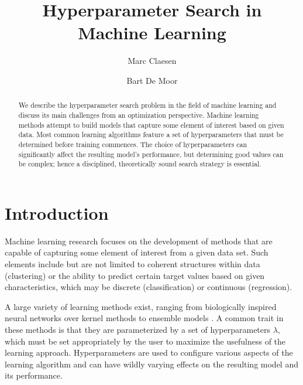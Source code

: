 \documentclass{mic2015}
\begin{document}
\title{Hyperparameter Search in Machine Learning}
\author{Marc Claesen \and Bart De Moor}
\maketitle

\begin{abstract}
We describe the hyperparameter search problem in the field of machine learning and discuss its main challenges from an optimization perspective. Machine learning methods attempt to build models that capture some element of interest based on given data. Most common learning algorithms feature a set of hyperparameters that must be determined before training commences. The choice of hyperparameters can significantly affect the resulting model's performance, but determining good values can be complex; hence a disciplined, theoretically sound search strategy is essential.
\end{abstract}

\section{Introduction}
Machine learning research focuses on the development of methods that are capable of capturing some element of interest from a given data set. Such elements include but are not limited to coherent structures within data (clustering) or the ability to predict certain target values based on given characteristics, which may be discrete (classification) or continuous (regression). %

A large variety of learning methods exist, ranging from biologically inspired neural networks \citep{bishop1995neural} over kernel methods \citep{scholkopf2002learning} to ensemble models \citep{breiman2001random, ensemblesvm-jmlr}. A common trait in these methods is that they are parameterized by a set of hyperparameters $\lambda$, which must be set appropriately by the user to maximize the usefulness of the learning approach. Hyperparameters are used to configure various aspects of the learning algorithm and can have wildly varying effects on the resulting model and its performance. 
\end{document}
